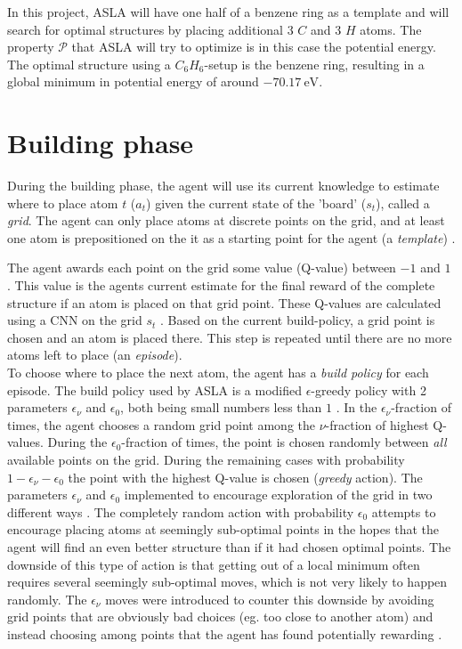 In this project, ASLA will have one half of a benzene ring as a template and will search for optimal structures by placing additional 3 $C$ and 3 $H$ atoms. The property $\mathcal{P}$ that ASLA will try to optimize is in this case the potential energy. The optimal structure using a $C_6H_6$-setup is the benzene ring, resulting in a global minimum in potential energy of around $\SI{-70.17}{\electronvolt}$.

\section{Building phase}
During the building phase, the agent will use its current knowledge to estimate where to place atom $t$ ($a_t$) given the current state of the 'board' ($s_t$), called a \textit{grid}. The agent can only place atoms at discrete points on the grid, and at least one atom is prepositioned on the it as a starting point for the agent (a \textit{template}) \cite{henrik_DLA}. 

The agent awards each point on the grid some value (Q-value) between $-1$ and $1$ \cite{henrik_DLA}. This value is the agents current estimate for the final reward of the complete structure if an atom is placed on that grid point. These Q-values are calculated using a CNN on the grid $s_t$ \cite{Hammer}. Based on the current build-policy, a grid point is chosen and an atom is placed there. This step is repeated until there are no more atoms left to place (an \textit{episode}). \\

To choose where to place the next atom, the agent has a \textit{build policy} for each episode. The build policy used by ASLA is a modified $\epsilon$-greedy policy with 2 parameters $\epsilon_\nu$ and $\epsilon_0$, both being small numbers less than $1$ \cite{henrik_DLA}. In the $\epsilon_\nu$-fraction of times, the agent chooses a random grid point among the $\nu$-fraction of highest Q-values. During the $\epsilon_0$-fraction of times, the point is chosen randomly between \textit{all} available points on the grid. During the remaining cases with probability $1-\epsilon_\nu - \epsilon_0$ the point with the highest Q-value is chosen (\textit{greedy} action). The parameters $\epsilon_\nu$ and $\epsilon_0$ implemented to encourage exploration of the grid in two different ways \cite{henrik_DLA}. The completely random action with probability $\epsilon_0$ attempts to encourage placing atoms at seemingly sub-optimal points in the hopes that the agent will find an even better structure than if it had chosen optimal points. The downside of this type of action is that getting out of a local minimum often requires several seemingly sub-optimal moves, which is not very likely to happen randomly. The $\epsilon_\nu$ moves were introduced to counter this downside by avoiding grid points that are obviously bad choices (eg. too close to another atom) and instead choosing among points that the agent has found potentially rewarding \cite{henrik_DLA}.


